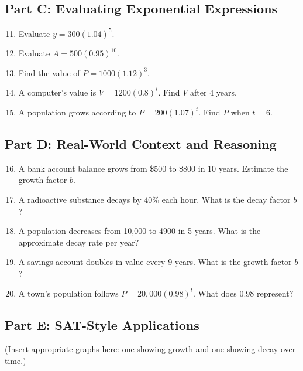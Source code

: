 \documentclass[12pt]{article}
\begin{document}
\subsection*{Part C: Evaluating Exponential Expressions}
\begin{enumerate}
  \setcounter{enumi}{10}
  \item Evaluate \(y = 300(1.04)^5.\)
  \item Evaluate \(A = 500(0.95)^{10}.\)
  \item Find the value of \(P = 1000(1.12)^3.\)
  \item A computer’s value is \(V = 1200(0.8)^t.\) Find \(V\) after 4 years.
  \item A population grows according to \(P = 200(1.07)^t.\) Find \(P\) when \(t = 6.\)
\end{enumerate}

\subsection*{Part D: Real-World Context and Reasoning}
\begin{enumerate}
  \setcounter{enumi}{15}
  \item A bank account balance grows from \$500 to \$800 in 10 years. Estimate the growth factor \(b.\)
  \item A radioactive substance decays by 40\% each hour. What is the decay factor \(b\)?
  \item A population decreases from 10,000 to 4900 in 5 years. What is the approximate decay rate per year?
  \item A savings account doubles in value every 9 years. What is the growth factor \(b\)?
  \item A town’s population follows \(P = 20{,}000(0.98)^t.\) What does 0.98 represent?
\end{enumerate}

\subsection*{Part E: SAT-Style Applications}
(Insert appropriate graphs here: one showing growth and one showing decay over time.)
\end{document}
